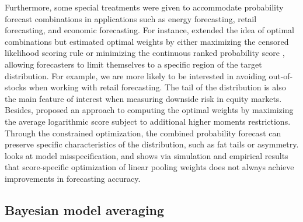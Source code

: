 \documentclass[a4paper,11pt]{article}
\begin{document}
Furthermore, some special treatments were given to accommodate probability forecast combinations in applications such as energy forecasting, retail forecasting, and economic forecasting. For instance, \citet{Opschoor2017-yu} extended the idea of optimal combinations but estimated optimal weights by either maximizing the censored likelihood scoring rule \citep{Diks2011-gj} or minimizing the continuous ranked probability score \citep{Gneiting2014-tz}, allowing forecasters to limit themselves to a specific region of the target distribution. For example, we are more likely to be interested in avoiding out-of-stocks when working with retail forecasting. The tail of the distribution is also the main feature of interest when measuring downside risk in equity markets. Besides, \citet{Pauwels2020-zl} proposed an approach to computing the optimal weights by maximizing the average logarithmic score subject to additional higher moments restrictions. Through the constrained optimization, the combined probability forecast can preserve specific characteristics of the distribution, such as fat tails or asymmetry. \citet{Martin2021-yi} looks at model misspecification, and shows via simulation and empirical results that score-specific optimization of linear pooling weights does not always achieve improvements in forecasting accuracy.

\subsection{Bayesian model averaging}
\label{sec:bma}
\end{document}
